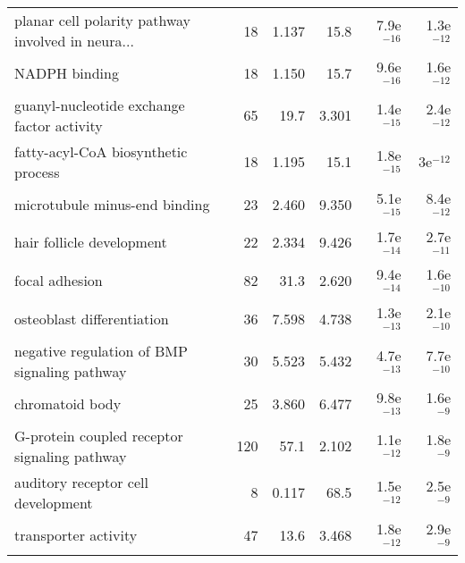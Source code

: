 \begin{longtable}{lrrrrr}
 planar cell polarity pathway involved in neura... &                      18 &                   1.137 &       15.8 &         7.9e$^{-16}$ &         1.3e$^{-12}$ \\
                                     NADPH binding &                      18 &                   1.150 &       15.7 &         9.6e$^{-16}$ &         1.6e$^{-12}$ \\
        guanyl-nucleotide exchange factor activity &                      65 &                    19.7 &      3.301 &         1.4e$^{-15}$ &         2.4e$^{-12}$ \\
               fatty-acyl-CoA biosynthetic process &                      18 &                   1.195 &       15.1 &         1.8e$^{-15}$ &           3e$^{-12}$ \\
                     microtubule minus-end binding &                      23 &                   2.460 &      9.350 &         5.1e$^{-15}$ &         8.4e$^{-12}$ \\
                         hair follicle development &                      22 &                   2.334 &      9.426 &         1.7e$^{-14}$ &         2.7e$^{-11}$ \\
                                    focal adhesion &                      82 &                    31.3 &      2.620 &         9.4e$^{-14}$ &         1.6e$^{-10}$ \\
                        osteoblast differentiation &                      36 &                   7.598 &      4.738 &         1.3e$^{-13}$ &         2.1e$^{-10}$ \\
      negative regulation of BMP signaling pathway &                      30 &                   5.523 &      5.432 &         4.7e$^{-13}$ &         7.7e$^{-10}$ \\
                                   chromatoid body &                      25 &                   3.860 &      6.477 &         9.8e$^{-13}$ &          1.6e$^{-9}$ \\
      G-protein coupled receptor signaling pathway &                     120 &                    57.1 &      2.102 &         1.1e$^{-12}$ &          1.8e$^{-9}$ \\
                auditory receptor cell development &                       8 &                   0.117 &       68.5 &         1.5e$^{-12}$ &          2.5e$^{-9}$ \\
                              transporter activity &                      47 &                    13.6 &      3.468 &         1.8e$^{-12}$ &          2.9e$^{-9}$ \\

\end{longtable}
